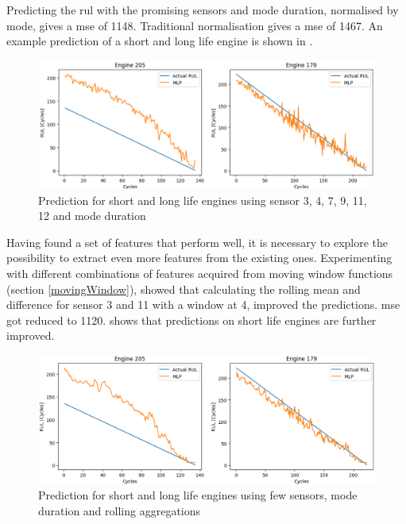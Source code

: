 \documentclass[english, a4paper]{report}
\begin{document}
{{{{                Predicting the \gls{rul} with the promising sensors and mode duration, normalised by mode, gives a \gls{mse} of 1148. Traditional normalisation gives a \gls{mse} of 1467. An example prediction of a short and long life engine is shown in . 
                
                \begin{figure}[H]
                    \centering \includegraphics[width=1\linewidth]{FewSensorPrediction}
                    \caption{Prediction for short and long life engines using sensor 3, 4, 7, 9, 11, 12 and mode duration}
                    \label{fig:FewSensorPrediction}
                \end{figure}
                
                Having found a set of features that perform well, it is necessary to explore the possibility to extract even more features from the existing ones. Experimenting with different combinations of features acquired from moving window functions (section \ref{movingWindow}), showed that calculating the rolling mean and difference for sensor 3 and 11 with a window at 4, improved the predictions. \Gls{mse} got reduced to 1120.  shows that predictions on short life engines are further improved.
                
                \begin{figure}[H]
                    \centering \includegraphics[width=1\linewidth]{FewSensorsWithFeaturesMeanDiffSens3and11}
                    \caption{Prediction for short and long life engines using few sensors, mode duration and rolling aggregations} \label{fig:FewSensorPredictionWithFeatures}
                \end{figure}
                
}}}}
\end{document}
